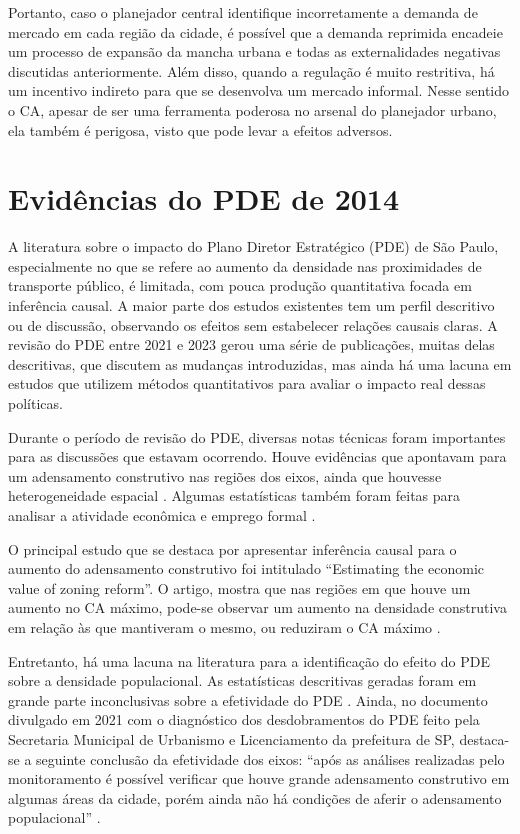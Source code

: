 Portanto, caso o planejador central identifique incorretamente a demanda de mercado em cada região da cidade, é possível que a demanda reprimida encadeie um processo de expansão da mancha urbana e todas as externalidades negativas discutidas anteriormente. Além disso, quando a regulação é muito restritiva, há um incentivo indireto para que se desenvolva um mercado informal. Nesse sentido o CA, apesar de ser uma ferramenta poderosa no arsenal do planejador urbano, ela também é perigosa, visto que pode levar a efeitos adversos. 

\section{Evidências do PDE de 2014}

A literatura sobre o impacto do Plano Diretor Estratégico (PDE) de São Paulo, especialmente no que se refere ao aumento da densidade nas proximidades de transporte público, é limitada, com pouca produção quantitativa focada em inferência causal. A maior parte dos estudos existentes tem um perfil descritivo ou de discussão, observando os efeitos sem estabelecer relações causais claras. A revisão do PDE entre 2021 e 2023 gerou uma série de publicações, muitas delas descritivas, que discutem as mudanças introduzidas, mas ainda há uma lacuna em estudos que utilizem métodos quantitativos para avaliar o impacto real dessas políticas.

Durante o período de revisão do PDE, diversas notas técnicas foram importantes para as discussões que estavam ocorrendo. Houve evidências que apontavam para um adensamento construtivo nas regiões dos eixos, ainda que houvesse heterogeneidade espacial \cite{IU50, nt1, nt2, Marques2023}. Algumas estatísticas também foram feitas para analisar a atividade econômica e emprego formal \cite{IU52, IU54}. 

O principal estudo que se destaca por apresentar inferência causal para o aumento do adensamento construtivo foi intitulado ``Estimating the economic value of zoning reform''. O artigo, mostra que nas regiões em que houve um aumento no CA máximo, pode-se observar um aumento na densidade construtiva em relação às que mantiveram o mesmo, ou reduziram o CA máximo \cite{Anagol2021}.

Entretanto, há uma lacuna na literatura para a identificação do efeito do PDE sobre a densidade populacional. As estatísticas descritivas geradas foram em grande parte inconclusivas sobre a efetividade do PDE \cite{IU51, IU66}. Ainda, no documento divulgado em 2021 com o diagnóstico dos desdobramentos do PDE feito pela Secretaria Municipal de Urbanismo e Licenciamento da prefeitura de SP, destaca-se a seguinte conclusão da efetividade dos eixos: ``após as análises realizadas pelo monitoramento é possível verificar que houve grande adensamento construtivo em algumas áreas da cidade, porém ainda não há condições de aferir
o adensamento populacional'' \cite{PDE:diagnostico}.

